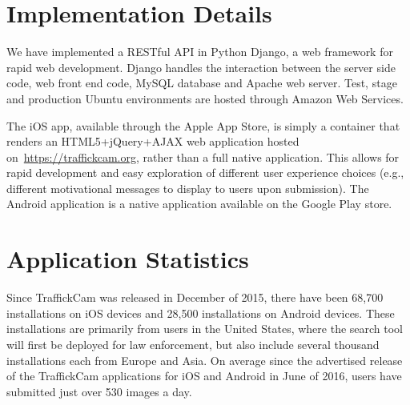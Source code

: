 \section{Implementation Details}
We have implemented a RESTful API in Python Django, a web framework for rapid web development. Django handles the interaction between the server side code, web front end code, MySQL database and Apache web server. Test, stage and production Ubuntu environments are hosted through Amazon Web Services.

The iOS app, available through the Apple App Store, is simply a container that renders an HTML5+jQuery+AJAX web application hosted on~\url{https://traffickcam.org}, rather than a full native application. This allows for rapid development and easy exploration of different user experience choices (e.g., different motivational messages to display to users upon submission). The Android application is a native application available on the Google Play store.

\section{Application Statistics}
Since TraffickCam was released in December of 2015, there have been 68,700 installations on iOS devices and 28,500 installations on Android devices. These installations are primarily from users in the United States, where the search tool will first be deployed for law enforcement, but also include several thousand installations each from Europe and Asia. On average since the advertised release of the TraffickCam applications for iOS and Android in June of 2016, users have submitted just over 530 images a day.